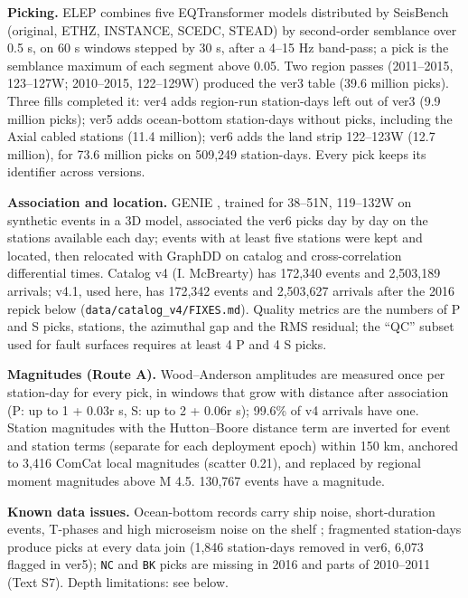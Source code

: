 \documentclass[11pt]{article}
\begin{document}
\textbf{Picking.} ELEP \citep{Yuan2023} combines five EQTransformer
models \citep{Mousavi2020} distributed by SeisBench \citep{Woollam2022}
(original, ETHZ, INSTANCE, SCEDC, STEAD) by second-order semblance over
0.5 s, on 60 s windows stepped by 30 s, after a 4--15 Hz band-pass; a
pick is the semblance maximum of each segment above 0.05. Two region
passes (2011--2015, 123--127\textdegree{}W; 2010--2015, 122--129\textdegree{}W) produced the
ver3 table (39.6 million picks). Three fills completed it: ver4 adds
region-run station-days left out of ver3 (9.9 million picks); ver5 adds
ocean-bottom station-days without picks, including the Axial cabled
stations (11.4 million); ver6 adds the land strip 122--123\textdegree{}W (12.7
million), for 73.6 million picks on 509,249 station-days. Every pick
keeps its identifier across versions.

\textbf{Association and location.} GENIE \citep{McBrearty2023}, trained
for 38--51\textdegree{}N, 119--132\textdegree{}W on synthetic events in a 3D model, associated
the ver6 picks day by day on the stations available each day; events
with at least five stations were kept and located, then relocated with
GraphDD \citep{McBrearty2025} on catalog and cross-correlation
differential times. Catalog v4 (I. McBrearty) has 172,340 events and
2,503,189 arrivals; v4.1, used here, has 172,342 events and 2,503,627
arrivals after the 2016 repick below
(\texttt{data/catalog\_v4/FIXES.md}). Quality metrics are the numbers of
P and S picks, stations, the azimuthal gap and the RMS residual; the
``QC'' subset used for fault surfaces requires at least 4 P and 4 S
picks.

\textbf{Magnitudes (Route A).} Wood--Anderson amplitudes are measured
once per station-day for every pick, in windows that grow with distance
after association (P: up to 1 + 0.03r s, S: up to 2 + 0.06r s); 99.6\%
of v4 arrivals have one. Station magnitudes with the Hutton--Boore
distance term are inverted for event and station terms (separate for
each deployment epoch) within 150 km, anchored to 3,416 ComCat local
magnitudes (scatter 0.21), and replaced by regional moment magnitudes
above M 4.5. 130,767 events have a magnitude.

\textbf{Known data issues.} Ocean-bottom records carry ship noise,
short-duration events, T-phases and high microseism noise on the shelf
\citep{Hilmo2020}; fragmented station-days produce picks at every data
join (1,846 station-days removed in ver6, 6,073 flagged in ver5);
\texttt{NC} and \texttt{BK} picks are missing in 2016 and parts of
2010--2011 (Text S7). Depth limitations: see below.
\end{document}
